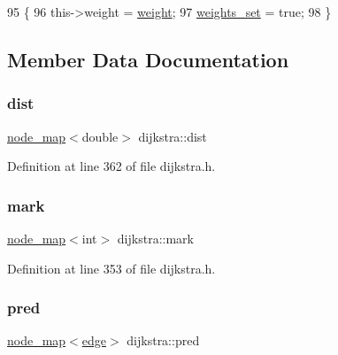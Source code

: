 \begin{DoxyCode}
95 \{
96     this->weight = \mbox{\hyperlink{classdijkstra_ac077e6b471b7178d7aef78e54c6a07cf}{weight}};
97     \mbox{\hyperlink{classdijkstra_ad60e0abd80def985afa753b7dadef771}{weights\_set}} = \textcolor{keyword}{true};
98 \}
\end{DoxyCode}


\subsection{Member Data Documentation}
\mbox{\label{classdijkstra_a154cafdd5511db8f61770348ef117cda}} 
\subsubsection{\texorpdfstring{dist}{dist}}
{\footnotesize\ttfamily \mbox{\hyperlink{classnode__map}{node\+\_\+map}}$<$double$>$ dijkstra\+::dist\hspace{0.3cm}{\ttfamily [private]}}



Definition at line 362 of file dijkstra.\+h.

\mbox{\label{classdijkstra_a407f98e26ca2cfb8c9ddecf4f8babdcc}} 
\subsubsection{\texorpdfstring{mark}{mark}}
{\footnotesize\ttfamily \mbox{\hyperlink{classnode__map}{node\+\_\+map}}$<$int$>$ dijkstra\+::mark\hspace{0.3cm}{\ttfamily [private]}}



Definition at line 353 of file dijkstra.\+h.

\mbox{\label{classdijkstra_a662d982b45b2992ecf7b7f7e6696f9f9}} 
\subsubsection{\texorpdfstring{pred}{pred}}
{\footnotesize\ttfamily \mbox{\hyperlink{classnode__map}{node\+\_\+map}}$<$\mbox{\hyperlink{classedge}{edge}}$>$ dijkstra\+::pred\hspace{0.3cm}{\ttfamily [private]}}



